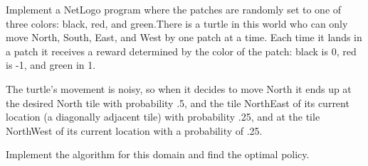 \begin{exercises}
\item Implement a NetLogo program where the patches are randomly set
  to one of three colors: black, red, and green.There is a turtle in
  this world who can only move North, South, East, and West by one
  patch at a time. Each time it lands in a patch it receives a reward
  determined by the color of the patch: black is 0, red is -1, and
  green in 1.

  The turtle's movement is noisy, so when it decides to move North it
  ends up at the desired North tile with probability .5, and the tile
  NorthEast of its current location (a diagonally adjacent tile) with
  probability .25, and at the tile NorthWest of its current location
  with a probability of .25.

  Implement the  algorithm for this domain and find
  the optimal policy.
\end{exercises}





